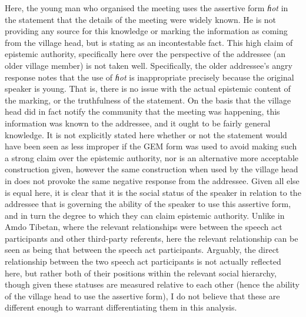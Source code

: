 Here, the young man who organised the meeting uses the assertive form \textit{ɦot} in the statement that the details of the meeting were widely known. He is not providing any source for this knowledge or marking the information as coming from the village head, but is stating as an incontestable fact. This high claim of epistemic authority, specifically here over the perspective of the addressee (an older village member) is not taken well. Specifically, the older addressee's angry response notes that the use of \textit{ɦot} is inappropriate precisely because the original speaker is young. That is, there is no issue with the actual epistemic content of the marking, or the truthfulness of the statement. On the basis that the village head did in fact notify the community that the meeting was happening, this information was known to the addressee, and it ought to be fairly general knowledge. It is not explicitly stated here whether or not the statement would have been seen as less improper if the GEM form was used to avoid making such a strong claim over the epistemic authority, nor is an alternative more acceptable construction given, however the same construction when used by the village head in  does not provoke the same negative response from the addressee. Given all else is equal here, it is clear that it is the social status of the speaker in relation to the addressee that is governing the ability of the speaker to use this assertive form, and in turn the degree to which they can claim epistemic authority. Unlike in Amdo Tibetan, where the relevant relationships were between the speech act participants and other third-party referents, here the relevant relationship can be seen as being that between the speech act participants. Arguably, the direct relationship between the two speech act participants is not actually reflected here, but rather both of their positions within the relevant social hierarchy, though given these statuses are measured relative to each other (hence the ability of the village head to use the assertive form), I do not believe that these are different enough to warrant differentiating them in this analysis.

